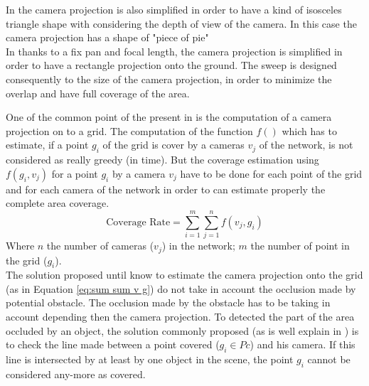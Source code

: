 In \citep{141*akbarzadeh2013} the camera projection is also simplified in order to have a kind of isosceles triangle shape with considering the depth of view of the camera. In this case the  camera projection has a shape of "piece of pie" \\
In \citep{146*li2011} thanks to a fix pan and focal length, the camera projection is simplified in order to have a rectangle projection onto the ground. The sweep is designed consequently to the size of the camera projection, in order to minimize the overlap and have full coverage of the area.  

One of the common point of the present in \cite{87*morsly2012,141*akbarzadeh2013,146*li2011,194*fu2010,22*zhao2008,33*reddy2012,193*fu2014,181*wang2017,165*jiang2010}   is the computation of a camera projection on to a grid. 
The computation of the function $f()$ which has to estimate, if  a point $g_i$ of the grid is cover by a cameras $v_j$ of the network,  is not considered as really greedy (in time). But the coverage estimation using $f(g_i,v_j)$ for a point $g_i$ by a camera $v_j$ have to be done for each point of the grid and for each camera of the network in order to can estimate properly the complete area coverage.
	\begin{equation} \label{eq:sum sum v g}
		\mbox{Coverage Rate}=\sum_{i=1}^{m}\sum_{j=1}^{n}f( v_j,g_i)
	\end{equation} %
Where $n$ the number of cameras ($v_j$) in the network; $m$ the number of point in the grid ($g_i$).  \\
The solution proposed until know to estimate the camera projection onto the grid (as in Equation \ref{eq:sum sum v g})  do not take in account the occlusion made by potential obstacle.
The occlusion  made by  the obstacle has to be taking in account depending then the camera projection.
 To detected the part of the area occluded by an object, the solution commonly proposed (as is well explain in  \citep{181*wang2017}) is to check the line made between a point covered ($g_i \in Pc$) and his camera. If this line is intersected by at least by one object in the scene, the point $g_i$ cannot be considered any-more as covered. 

